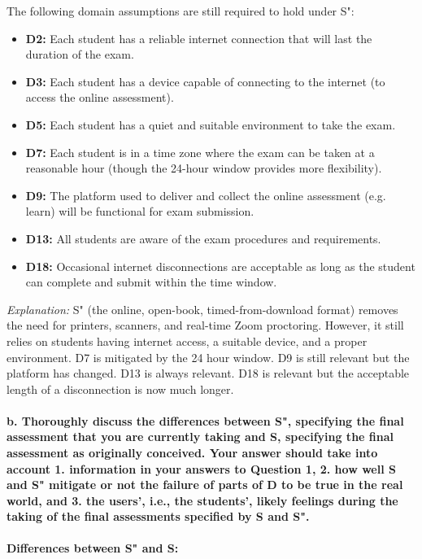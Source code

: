 \documentclass{article}
\begin{document}
The following domain assumptions are still required to hold under S":

\begin{itemize}
    \item \textbf{D2:} Each student has a reliable internet connection that will last the duration of the exam.
    \item \textbf{D3:} Each student has a device capable of connecting to the internet (to access the online assessment).
    \item \textbf{D5:} Each student has a quiet and suitable environment to take the exam.
    \item \textbf{D7:} Each student is in a time zone where the exam can be taken at a reasonable hour (though the 24-hour window provides more flexibility).
    \item \textbf{D9:} The platform used to deliver and collect the online assessment (e.g. learn) will be functional for exam submission.
    \item \textbf{D13:} All students are aware of the exam procedures and requirements.
    \item \textbf{D18:} Occasional internet disconnections are acceptable as long as the student can complete and submit within the time window.
\end{itemize}

\textit{Explanation:} S" (the online, open-book, timed-from-download format) removes the need for printers, scanners, and real-time Zoom proctoring. However, it still relies on students having internet access, a suitable device, and a proper environment. D7 is mitigated by the 24 hour window. D9 is still relevant but the platform has changed. D13 is always relevant. D18 is relevant but the acceptable length of a disconnection is now much longer.

\paragraph{b. Thoroughly discuss the differences between S", specifying the final assessment that you are currently taking and S, specifying the final assessment as originally conceived. Your answer should take into account 1. information in your answers to Question 1, 2. how well S and S" mitigate or not the failure of parts of D to be true in the real world, and 3. the users', i.e., the students', likely feelings during the taking of the final assessments specified by S and S".}

\textbf{Differences between S" and S:}
\end{document}
